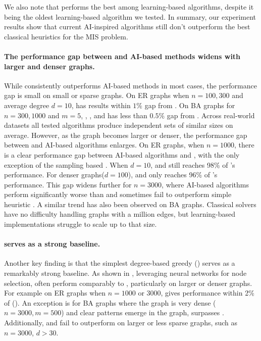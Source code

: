 We also note that \lwd performs the best among learning-based algorithms, despite it being the oldest learning-based algorithm we tested.
In summary, our experiment results show that current AI-inspired algorithms still don't outperform the best classical heuristics for the MIS problem.





\paragraph{The performance gap between \redumis and AI-based methods widens with larger and denser graphs.} While \redumis consistently outperforms AI-based methods in most cases, the performance gap is small on small or sparse graphs. 
On ER graphs when $n=100,300$ and average degree $d=10$, \lwd has results within $1\%$ gap from \redumis. On BA graphs for $n=300,1000$ and $m=5$, \lwd, \difusco, and \diffuco has less than $0.5\%$ gap from \redumis. Across real-world datasets 
all tested algorithms produce independent sets of similar sizes on average.
However, as the graph becomes larger or denser, the performance gap between \redumis and AI-based algorithms enlarges. 
On ER graphs, when $n=1000$, there is a clear performance gap between AI-based algorithms and \redumis, with the only exception of the sampling based \isco. When $d=10$, \diffuco and \lwd still reaches 98\% of \redumis's performance. For denser graphs($d=100$), \diffuco and \lwd only reaches 96\% of \redumis's performance. This gap widens further for $n=3000$, where AI-based algorithms perform significantly worse than \redumis and sometimes fail to outperform simple heuristic \deggreedy. 
A similar trend has also been observed on BA graphs.
Classical solvers have no difficulty handling graphs with a million edges, but learning-based implementations struggle to scale up to that size.
\paragraph{\deggreedy serves as a strong baseline.} Another key finding is that the simplest degree-based greedy (\deggreedy) serves as a remarkably strong baseline. As shown in , leveraging neural networks for node selection, \gflownets often perform comparably to \deggreedy, particularly on larger or denser graphs.
For example on ER graphs when $n=1000$ or $3000$, \gflownets gives performance within 2\% of \deggreedy (). An exception is for BA graphs where the graph is very dense ($n=3000,m=500$) and clear patterns emerge in the graph, \gflownets surpasses \deggreedy.
Additionally, \difusco and \pcqo fail to outperform \deggreedy on larger or less sparse graphs, such as  $n=3000$, $d>30$.
